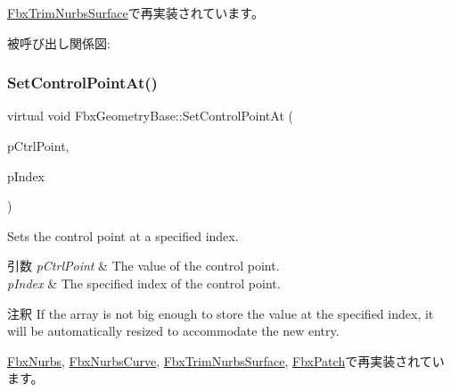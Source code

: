 \hyperlink{class_fbx_trim_nurbs_surface_a8a42014521b0c91eba3554ecafe56814}{Fbx\+Trim\+Nurbs\+Surface}で再実装されています。

被呼び出し関係図\+:
\mbox{\label{class_fbx_geometry_base_ab2d5567b073e6b9f4feb5bb428fa99e4}} 
\subsubsection{\texorpdfstring{Set\+Control\+Point\+At()}{SetControlPointAt()}\hspace{0.1cm}{\footnotesize\ttfamily [2/2]}}
{\footnotesize\ttfamily virtual void Fbx\+Geometry\+Base\+::\+Set\+Control\+Point\+At (\begin{DoxyParamCaption}\item[{const \hyperlink{class_fbx_vector4}{Fbx\+Vector4} \&}]{p\+Ctrl\+Point,  }\item[{int}]{p\+Index }\end{DoxyParamCaption})\hspace{0.3cm}{\ttfamily [virtual]}}

Sets the control point at a specified index. 
\begin{DoxyParams}{引数}
{\em p\+Ctrl\+Point} & The value of the control point. \\
\hline
{\em p\+Index} & The specified index of the control point.\\
\hline
\end{DoxyParams}
\begin{DoxyRemark}{注釈}
If the array is not big enough to store the value at the specified index, it will be automatically resized to accommodate the new entry. 
\end{DoxyRemark}


\hyperlink{class_fbx_nurbs_a46f56bfb4c6ffc90b79b2e0b81c89880}{Fbx\+Nurbs}, \hyperlink{class_fbx_nurbs_curve_a7313bcfe1a7b6d566f30e5395bf89877}{Fbx\+Nurbs\+Curve}, \hyperlink{class_fbx_trim_nurbs_surface_acec735094f0448ab58a48baf38c0c7ef}{Fbx\+Trim\+Nurbs\+Surface}, \hyperlink{class_fbx_patch_a43bd49dba561cff8f166b8f7a12816f6}{Fbx\+Patch}で再実装されています。

\mbox{\label{class_fbx_geometry_base_aea3fc519575d88c430221b0e74040b0c}} 
